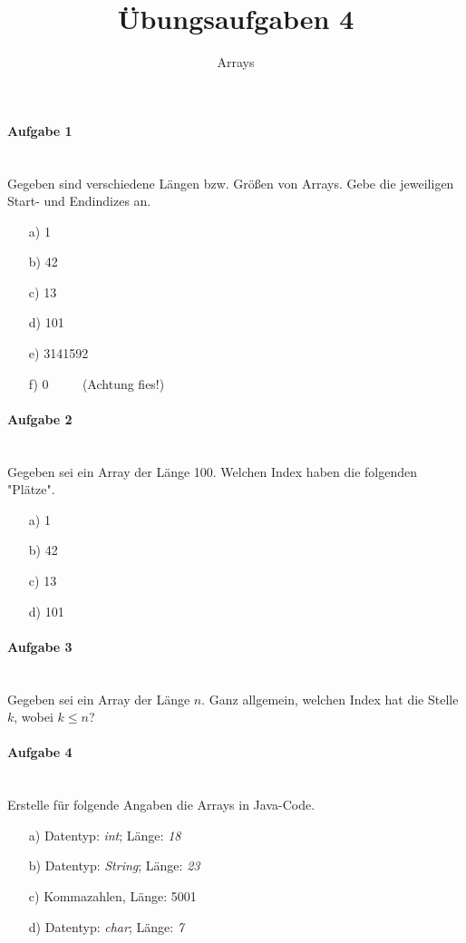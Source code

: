 \documentclass[12pt,a4paper,ngerman]{scrartcl}
\title{Übungsaufgaben 4}
\subtitle{Arrays}
\date{}
\begin{document}
	\maketitle
	
	\paragraph{Aufgabe 1}\mbox{}\\
	Gegeben sind verschiedene Längen bzw. Größen von Arrays. Gebe die jeweiligen Start- und Endindizes an.
	
	\begin{itemize}
		\item[a)] 1
		\item[b)] 42
		\item[c)] 13
		\item[d)] 101
		\item[e)] 3141592
		\item[f)] 0 $\qquad$ (Achtung fies!)
	\end{itemize}

	\paragraph{Aufgabe 2}\mbox{}\\
	Gegeben sei ein Array der Länge 100. Welchen Index haben die folgenden "Plätze".

	\begin{itemize}
		\item[a)] 1
		\item[b)] 42
		\item[c)] 13
		\item[d)] 101
	\end{itemize}

	\paragraph{Aufgabe 3}\mbox{}\\
	Gegeben sei ein Array der Länge $n$. Ganz allgemein, welchen Index hat die Stelle $k$, wobei $k \le n$?

	\paragraph{Aufgabe 4}\mbox{}\\
	Erstelle für folgende Angaben die Arrays in Java-Code.

	\begin{itemize}
		\item[a)] Datentyp: \emph{int}; Länge: \emph{18}
		\item[b)] Datentyp: \emph{String}; Länge: \emph{23}
		\item[c)] Kommazahlen, Länge: 5001
		\item[d)] Datentyp: \emph{char}; Länge: \emph{7}
	\end{itemize}
\end{document}
